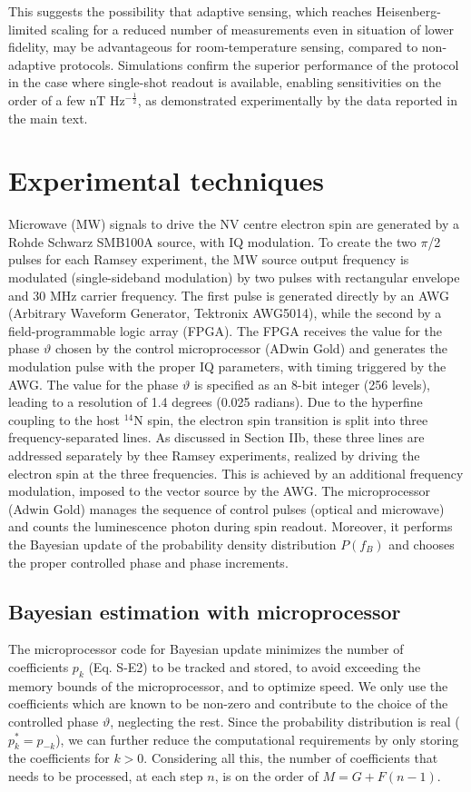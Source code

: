 \documentclass{report}
\begin{document}
This suggests the possibility that adaptive sensing, which reaches Heisenberg-limited scaling for a reduced number of measurements even in situation of lower fidelity, may be advantageous for room-temperature sensing, compared to non-adaptive protocols.
Simulations confirm the superior performance of the protocol in the case where single-shot readout is available, enabling sensitivities on the order of a few nT Hz$^{-\frac{1}{2}}$, as demonstrated experimentally by the data reported in the main text.


\section{Experimental techniques}

Microwave (MW) signals to drive the NV centre electron spin are generated by a Rohde Schwarz SMB100A source, with IQ modulation.  To create the two $\pi$/2 pulses for each Ramsey experiment, the MW source output frequency is modulated (single-sideband modulation) by two pulses with rectangular envelope and 30 MHz carrier frequency. The first pulse is generated directly by an AWG (Arbitrary Waveform Generator, Tektronix AWG5014), while the second by a field-programmable logic array (FPGA). The FPGA receives the value for the phase $\vartheta$ chosen by the control microprocessor (ADwin Gold) and generates the modulation pulse with the proper IQ parameters, with timing triggered by the AWG. The value for the phase $\vartheta$ is specified as an 8-bit integer (256 levels), leading to a resolution of 1.4 degrees (0.025 radians).
Due to the hyperfine coupling to the host $^{14}$N spin, the electron spin transition is split into three frequency-separated lines. As discussed in Section IIb, these three lines are addressed separately by thee Ramsey experiments, realized by driving the electron spin at the three frequencies. This is achieved by an additional frequency modulation, imposed to the vector source by the AWG. The microprocessor (Adwin Gold) manages the sequence  of control pulses (optical and microwave) and counts the luminescence photon during spin readout. Moreover, it performs the Bayesian update of the probability density distribution $P(f_B)$ and chooses the proper controlled phase and phase increments. 

\subsection{Bayesian estimation with microprocessor}
The microprocessor code for Bayesian update minimizes the number of coefficients $p_k$ (Eq. S-E2) to be tracked and stored, to avoid exceeding the memory bounds of the microprocessor, and to optimize speed. We only use the coefficients which are known to be non-zero and contribute to the choice of the controlled phase $\vartheta$, neglecting the rest. Since the probability distribution is real ($p_k^* = p_{-k}$), we can further reduce the computational requirements by only storing the coefficients for $k>0$. Considering all this, the number of coefficients that needs to be processed, at each step $n$, is on the order of $M = G+F(n-1)$.
\end{document}
